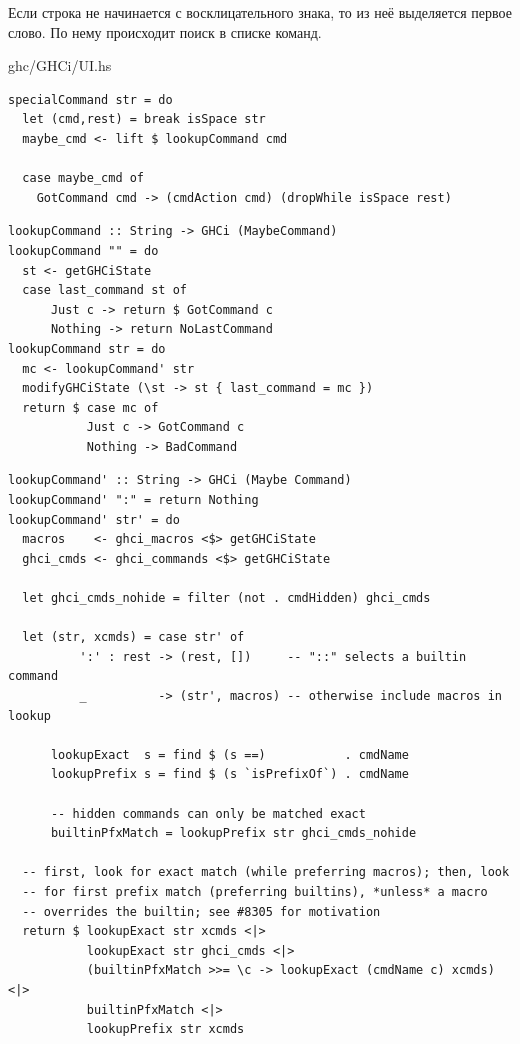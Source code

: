 \documentclass[fontsize=14pt, paper=a4, pagesize, DIV=calc]{scrartcl}
\begin{document}
Если строка не начинается с восклицательного знака, то из неё выделяется первое слово.
По нему происходит поиск в списке команд. 

\begin{ListingEnv}
\caption{ghc/GHCi/UI.hs}
\begin{lstlisting}[firstnumber=1206]
specialCommand str = do
  let (cmd,rest) = break isSpace str
  maybe_cmd <- lift $ lookupCommand cmd

  case maybe_cmd of
    GotCommand cmd -> (cmdAction cmd) (dropWhile isSpace rest)
\end{lstlisting}
\end{ListingEnv}

\begin{ListingEnv}
\caption{}
\begin{lstlisting}
lookupCommand :: String -> GHCi (MaybeCommand)
lookupCommand "" = do
  st <- getGHCiState
  case last_command st of
      Just c -> return $ GotCommand c
      Nothing -> return NoLastCommand
lookupCommand str = do
  mc <- lookupCommand' str
  modifyGHCiState (\st -> st { last_command = mc })
  return $ case mc of
           Just c -> GotCommand c
           Nothing -> BadCommand
\end{lstlisting}
\end{ListingEnv}

\begin{ListingEnv}
\caption{}
\begin{lstlisting}
lookupCommand' :: String -> GHCi (Maybe Command)
lookupCommand' ":" = return Nothing
lookupCommand' str' = do
  macros    <- ghci_macros <$> getGHCiState
  ghci_cmds <- ghci_commands <$> getGHCiState

  let ghci_cmds_nohide = filter (not . cmdHidden) ghci_cmds

  let (str, xcmds) = case str' of
          ':' : rest -> (rest, [])     -- "::" selects a builtin command
          _          -> (str', macros) -- otherwise include macros in lookup

      lookupExact  s = find $ (s ==)           . cmdName
      lookupPrefix s = find $ (s `isPrefixOf`) . cmdName

      -- hidden commands can only be matched exact
      builtinPfxMatch = lookupPrefix str ghci_cmds_nohide

  -- first, look for exact match (while preferring macros); then, look
  -- for first prefix match (preferring builtins), *unless* a macro
  -- overrides the builtin; see #8305 for motivation
  return $ lookupExact str xcmds <|>
           lookupExact str ghci_cmds <|>
           (builtinPfxMatch >>= \c -> lookupExact (cmdName c) xcmds) <|>
           builtinPfxMatch <|>
           lookupPrefix str xcmds
\end{lstlisting}
\end{ListingEnv}
\end{document}
